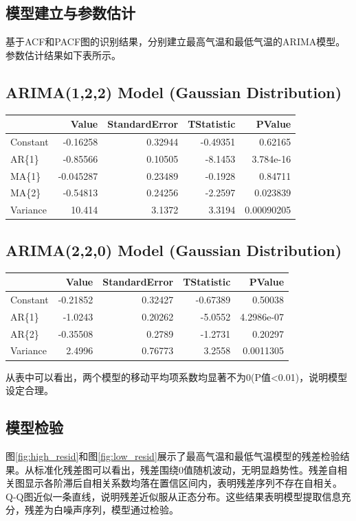 \documentclass[withoutpreface,bwprint]{cumcmthesis} %
\begin{document}
\subsection{模型建立与参数估计}
基于ACF和PACF图的识别结果，分别建立最高气温和最低气温的ARIMA模型。参数估计结果如下表所示。
\begin{center}
\subsection*{ARIMA(1,2,2) Model (Gaussian Distribution)}
\begin{tabular}[H]{lrrrr}
    & Value     & StandardError & TStatistic & PValue \\
    \midrule
    Constant & -0.16258  & 0.32944       & -0.49351   & 0.62165 \\
    AR\{1\}  & -0.85566  & 0.10505       & -8.1453    & 3.784e-16 \\
    MA\{1\}  & -0.045287 & 0.23489       & -0.1928    & 0.84711 \\
    MA\{2\}  & -0.54813  & 0.24256       & -2.2597    & 0.023839 \\
    Variance & 10.414    & 3.1372        & 3.3194     & 0.00090205 \\
\end{tabular}

\vspace{1em} %

\subsection*{ARIMA(2,2,0) Model (Gaussian Distribution)}
\begin{tabular}[H]{lrrrr}
    & Value     & StandardError & TStatistic & PValue \\
    \midrule
    Constant & -0.21852  & 0.32427       & -0.67389   & 0.50038 \\
    AR\{1\}  & -1.0243   & 0.20262       & -5.0552    & 4.2986e-07 \\
    AR\{2\}  & -0.35508  & 0.2789        & -1.2731    & 0.20297 \\
    Variance & 2.4996    & 0.76773       & 3.2558     & 0.0011305 \\
\end{tabular}
\end{center}

从表中可以看出，两个模型的移动平均项系数均显著不为0(P值<0.01)，说明模型设定合理。

\subsection{模型检验}
图\ref{fig:high_resid}和图\ref{fig:low_resid}展示了最高气温和最低气温模型的残差检验结果。从标准化残差图可以看出，残差围绕0值随机波动，无明显趋势性。残差自相关图显示各阶滞后自相关系数均落在置信区间内，表明残差序列不存在自相关。Q-Q图近似一条直线，说明残差近似服从正态分布。这些结果表明模型提取信息充分，残差为白噪声序列，模型通过检验。
\end{document}
